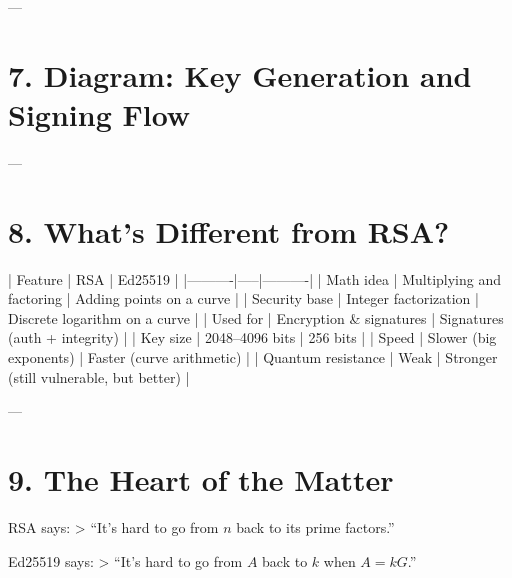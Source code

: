 \documentclass[12pt]{article}
\begin{document}
---

\section*{7. Diagram: Key Generation and Signing Flow}

\begin{center}
\end{center}

---

\section*{8. What’s Different from RSA?}

| Feature | RSA | Ed25519 |
|----------|-----|----------|
| Math idea | Multiplying and factoring | Adding points on a curve |
| Security base | Integer factorization | Discrete logarithm on a curve |
| Used for | Encryption \& signatures | Signatures (auth + integrity) |
| Key size | 2048–4096 bits | 256 bits |
| Speed | Slower (big exponents) | Faster (curve arithmetic) |
| Quantum resistance | Weak | Stronger (still vulnerable, but better) |

---

\section*{9. The Heart of the Matter}

RSA says:  
> “It’s hard to go from \( n \) back to its prime factors.”

Ed25519 says:  
> “It’s hard to go from \( A \) back to \( k \) when \( A = kG \).”
\end{document}
